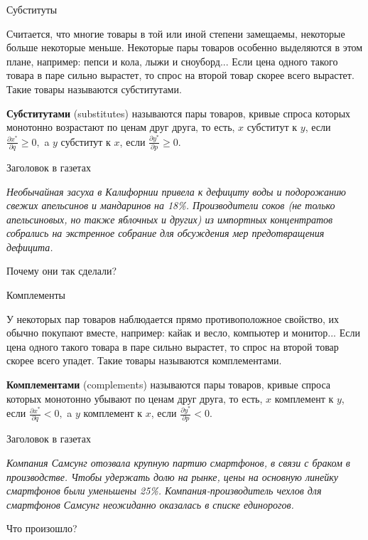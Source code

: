\documentclass{beamer}
\begin{document}
\begin{frame}{Субституты}

Считается, что многие товары в той или иной степени замещаемы, некоторые больше некоторые меньше. Некоторые пары товаров особенно выделяются в этом плане, например: пепси и кола, лыжи и сноуборд... Если цена одного такого товара в паре сильно вырастет, то спрос на второй товар скорее всего вырастет. Такие товары называются субститутами.

\begin{definition}
\textbf{Субститутами} (substitutes) называются пары товаров, кривые спроса которых монотонно возрастают по ценам друг друга, то есть, $x$ субститут к $y$, если $\frac{\partial x^{\ast}}{\partial q} \geqslant 0,$ a $y$ субститут к $x$, если $\frac{\partial y^{\ast}}{\partial p} \geqslant 0.$
\end{definition}

\end{frame}

\begin{frame}{Заголовок в газетах}

\textit{Необычайная засуха в Калифорнии привела к дефициту воды и подорожанию свежих апельсинов и мандаринов на 18\%. Производители соков (не только апельсиновых, но также яблочных и других) из импортных концентратов собрались на экстренное собрание для обсуждения мер предотвращения дефицита.}

Почему они так сделали?

\end{frame}

\begin{frame}{Комплементы}

У некоторых пар товаров наблюдается прямо противоположное свойство, их обычно покупают вместе, например: кайак и весло, компьютер и монитор...  Если цена одного такого товара в паре сильно вырастет, то спрос на второй товар скорее всего упадет. Такие товары называются комплементами.

\begin{definition}
\textbf{Комплементами} (complements) называются пары товаров, кривые спроса которых монотонно убывают по ценам друг друга, то есть, $x$ комплемент к $y$, если $\frac{\partial x^{\ast}}{\partial q} < 0,$ a $y$ комплемент к $x$, если $\frac{\partial y^{\ast}}{\partial p} < 0.$
\end{definition}

\end{frame}

\begin{frame}{Заголовок в газетах}

\textit{Компания Самсунг отозвала крупную партию смартфонов, в связи с браком в производстве. Чтобы удержать долю на рынке, цены на основную линейку  смартфонов были уменьшены 25\%. Компания-производитель чехлов для смартфонов Самсунг неожиданно оказалась в списке единорогов.}

Что произошло?

\end{frame}
\end{document}
